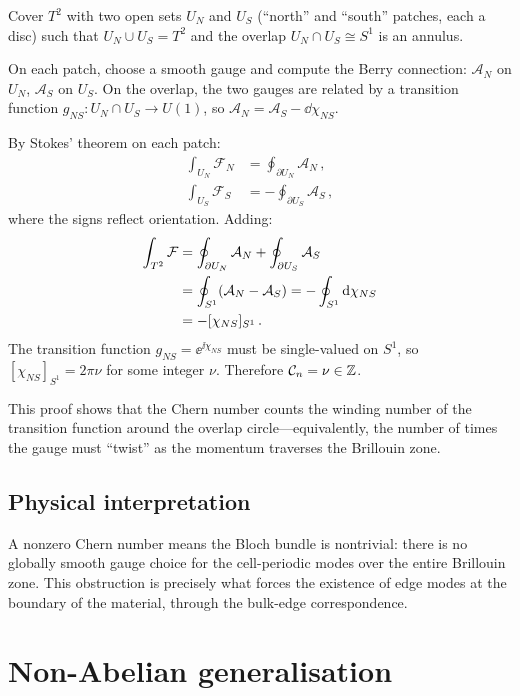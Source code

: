 Cover $T^2$ with two open sets $U_N$ and $U_S$ (``north'' and
``south'' patches, each a disc) such that $U_N\cup U_S=T^2$ and the
overlap $U_N\cap U_S\cong S^1$ is an annulus.

On each patch, choose a smooth gauge and compute the Berry connection:
$\mathcal{A}_N$ on $U_N$, $\mathcal{A}_S$ on $U_S$.  On the overlap,
the two gauges are related by a transition function
$g_{NS}:U_N\cap U_S\to U(1)$, so
$\mathcal{A}_N=\mathcal{A}_S-\dd\chi_{NS}$.

By Stokes' theorem on each patch:
\begin{align}
  \int_{U_N}\mathcal{F}_N &= \oint_{\partial U_N}\mathcal{A}_N\,,\\
  \int_{U_S}\mathcal{F}_S &= -\oint_{\partial U_S}\mathcal{A}_S\,,
\end{align}
where the signs reflect orientation.  Adding:
\begin{align}
  \int_{T^2}\mathcal{F}
  &= \oint_{\partial U_N}\mathcal{A}_N
  + \oint_{\partial U_S}\mathcal{A}_S
  \notag\\
  &= \oint_{S^1}(\mathcal{A}_N-\mathcal{A}_S)
  = -\oint_{S^1}\mathrm{d}\chi_{NS}
  \notag\\
  &= -[\chi_{NS}]_{S^1}\,.
\end{align}
The transition function $g_{NS}=\ee^{\ii\chi_{NS}}$ must be
single-valued on $S^1$, so $[\chi_{NS}]_{S^1}=2\pi\nu$ for some
integer $\nu$.  Therefore $\mathcal{C}_n=\nu\in\mathbb{Z}$.

This proof shows that the Chern number counts the winding number of
the transition function around the overlap circle---equivalently, the
number of times the gauge must ``twist'' as the momentum traverses the
Brillouin zone.

\subsection{Physical interpretation}
\label{sec:appB-physical}

A nonzero Chern number means the Bloch bundle is nontrivial: there is
no globally smooth gauge choice for the cell-periodic modes over the
entire Brillouin zone.  This obstruction is precisely what forces the
existence of edge modes at the boundary of the material, through the
bulk-edge correspondence.

\section{Non-Abelian generalisation}
\label{sec:appB-non-abelian}

